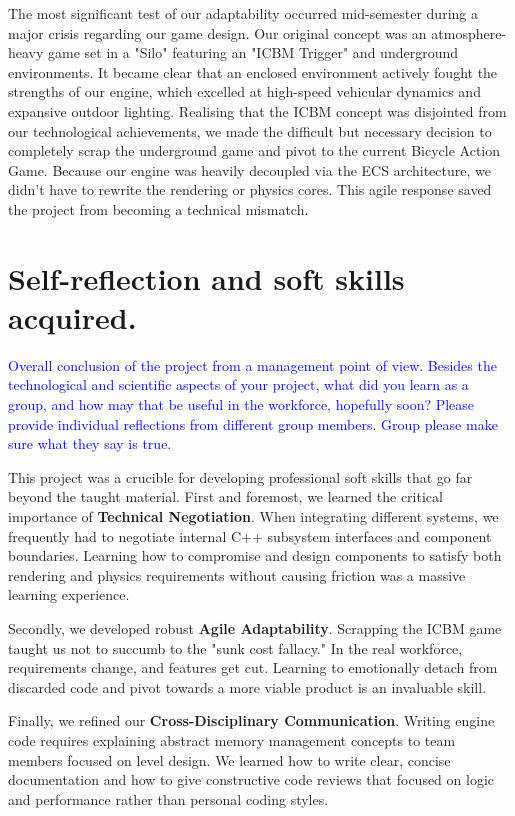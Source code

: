 \documentclass[acmtog, nonacm]{acmart}
\begin{document}
The most significant test of our adaptability occurred mid-semester during a major crisis regarding our game design. Our original concept was an atmosphere-heavy game set in a "Silo" featuring an "ICBM Trigger" and underground environments. It became clear that an enclosed environment actively fought the strengths of our engine, which excelled at high-speed vehicular dynamics and expansive outdoor lighting. Realising that the ICBM concept was disjointed from our technological achievements, we made the difficult but necessary decision to completely scrap the underground game and pivot to the current Bicycle Action Game. Because our engine was heavily decoupled via the ECS architecture, we didn't have to rewrite the rendering or physics cores. This agile response saved the project from becoming a technical mismatch.

\section{Self-reflection and soft skills acquired.}
\textcolor{blue}{Overall conclusion of the project from a management point of view. 
Besides the technological and scientific aspects of your project, what did you learn as a group, and how may that be useful in the workforce, hopefully soon? Please provide individual reflections from different group members. Group please make sure what they say is true.}

This project was a crucible for developing professional soft skills that go far beyond the taught material. First and foremost, we learned the critical importance of \textbf{Technical Negotiation}. When integrating different systems, we frequently had to negotiate internal C++ subsystem interfaces and component boundaries. Learning how to compromise and design components to satisfy both rendering and physics requirements without causing friction was a massive learning experience.

Secondly, we developed robust \textbf{Agile Adaptability}. Scrapping the ICBM game taught us not to succumb to the "sunk cost fallacy." In the real workforce, requirements change, and features get cut. Learning to emotionally detach from discarded code and pivot towards a more viable product is an invaluable skill.

Finally, we refined our \textbf{Cross-Disciplinary Communication}. Writing engine code requires explaining abstract memory management concepts to team members focused on level design. We learned how to write clear, concise documentation and how to give constructive code reviews that focused on logic and performance rather than personal coding styles.
\end{document}
